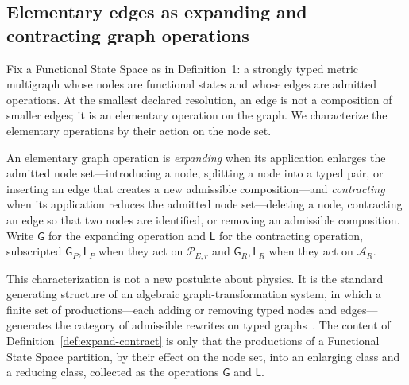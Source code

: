 \documentclass[10pt,twoside,a5paper]{article}
\theoremstyle{definition}
\begin{document}
\subsection{Elementary edges as expanding and contracting graph operations}
\label{subsec:elementary-edges-topological}

Fix a Functional State Space as in Definition~1: a strongly typed metric multigraph
whose nodes are functional states and whose edges are admitted operations. At the
smallest declared resolution, an edge is not a composition of smaller edges; it is an
elementary operation on the graph. We characterize the elementary operations by their
action on the node set.

\begin{definition}
\label{def:expand-contract}
An elementary graph operation is \emph{expanding} when its application enlarges the
admitted node set---introducing a node, splitting a node into a typed pair, or
inserting an edge that creates a new admissible composition---and \emph{contracting}
when its application reduces the admitted node set---deleting a node, contracting an
edge so that two nodes are identified, or removing an admissible composition. Write
$\mathsf{G}$ for the expanding operation and $\mathsf{L}$ for the contracting
operation, subscripted $\mathsf{G}_{P},\mathsf{L}_{P}$ when they act on
$\mathcal{P}_{E,r}$ and $\mathsf{G}_{R},\mathsf{L}_{R}$ when they act on
$\mathcal{A}_{R}$.
\end{definition}

This characterization is not a new postulate about physics. It is the standard
generating structure of an algebraic graph-transformation system, in which a
finite set of productions---each adding or removing typed nodes and edges---generates
the category of admissible rewrites on typed graphs~\cite{Ehrig2006,Arrighi2013}. The
content of Definition~\ref{def:expand-contract} is only that the productions of a
Functional State Space partition, by their effect on the node set, into an enlarging
class and a reducing class, collected as the operations $\mathsf{G}$ and $\mathsf{L}$.
\end{document}

